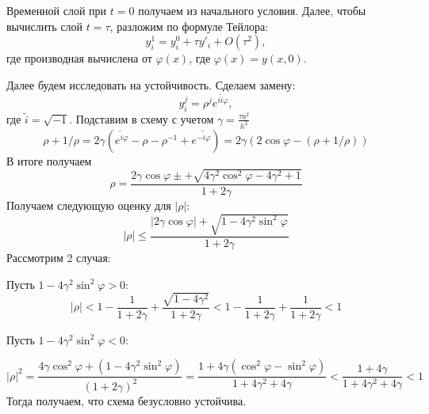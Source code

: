 \documentclass{article}
\begin{document}
\begin{enumerate}
		Временной слой при $t = 0$ получаем из начального условия. Далее, чтобы 
		вычислить слой $t = \tau$, разложим по формуле Тейлора:
		\begin{equation*}
			y_i^1 = y_i^0 + \tau y'_i + O(\tau^2),
		\end{equation*}
		где производная вычислена от $\varphi(x)$, где $\varphi(x) = y(x,0)$.
		
		Далее будем исследовать на устойчивость. Сделаем замену:
		\begin{equation*}
			y_i^j = \rho^j e^{i \tilde{i} \varphi},
		\end{equation*}
		где $\tilde{i} = \sqrt{-1}$.
		Подставим в схему с учетом $\gamma = \frac{\tau a^2}{h^2}$
		\begin{equation*}
			\rho + 1/\rho = 2 \gamma \left(e^{\tilde{i} \varphi } - \rho - 
			\rho^{-1} + e^{- \tilde{i} \varphi }\right) = 2 \gamma (2 \cos \varphi 
			- (\rho + 1/\rho))
		\end{equation*}
		В итоге получаем 
		\begin{equation*}
			\rho = \frac{2 \gamma \cos \varphi \pm + \sqrt{4 \gamma ^ 2 \cos^2\varphi - 4\gamma^2 +1}}
			{1+2\gamma}
		\end{equation*}
		Получаем следующую оценку для $|\rho|$:
		\begin{equation*}
			|\rho| \leqslant \frac{|2 \gamma \cos \varphi| + \sqrt{1-4\gamma^2 \sin^2 \varphi}}{1+2\gamma}
		\end{equation*}
		Рассмотрим 2 случая:
		
		Пусть $1-4\gamma^2 \sin^2\varphi > 0$:
		\begin{equation*}
			|\rho| < 1 - \frac{1}{1+2\gamma} +  \frac{\sqrt{1-4\gamma^2}}{1+2\gamma} < 1 - \frac{1}{1+2 \gamma} + \frac{1}{1+2\gamma} < 1
		\end{equation*}

		Пусть  $1-4\gamma^2 \sin^2\varphi < 0$:

		\begin{equation*}
			|\rho|^2 = \frac{4\gamma \cos^2 \varphi + (1 - 4\gamma^2 \sin^2 \varphi)}{(1+2\gamma)^2} = 
			\frac{1 + 4 \gamma (\cos^2 \varphi - \sin^2 \varphi)}{1+4\gamma^2 + 4\gamma } < \frac{1+4\gamma}{1+4\gamma^2 + 4\gamma} < 1
		\end{equation*}
		Тогда получаем, что схема безусловно устойчива.

	\end{enumerate}
\end{document}
